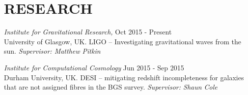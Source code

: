 \section{RESEARCH}

{\sl Institute for Gravitational Research, } \hfill Oct 2015 - Present \\
University of Glasgow, UK.
\hspace{3 mm} LIGO -- Investigating gravitational waves from the sun.
\emph{Supervisor: Matthew Pitkin}


{\sl Institute for Computational Cosmology} \hfill Jun 2015 - Sep 2015 \\
Durham University, UK. 
\hspace{3 mm} DESI -- mitigating redshift incompleteness for galaxies that are not assigned fibres in the BGS survey. \emph{Supervisor: Shaun Cole}
 
